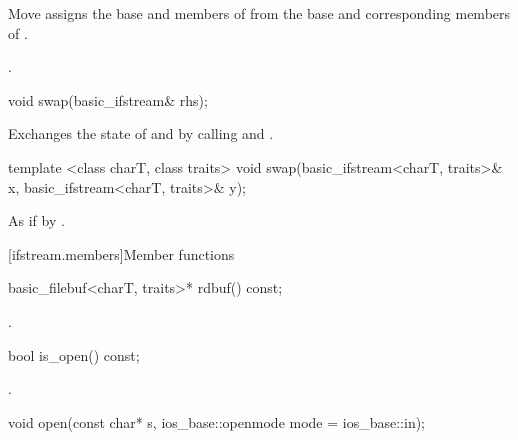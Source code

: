 \begin{itemdescr}
\pnum
\effects Move assigns the base and members of  from the base and corresponding
members of .

\pnum
\returns {}.
\end{itemdescr}

%
\begin{itemdecl}
void swap(basic_ifstream& rhs);
\end{itemdecl}

\begin{itemdescr}
\pnum
\effects Exchanges the state of 
and  by calling
 and
.
\end{itemdescr}

%
\begin{itemdecl}
template <class charT, class traits>
  void swap(basic_ifstream<charT, traits>& x,
            basic_ifstream<charT, traits>& y);
\end{itemdecl}

\begin{itemdescr}
\pnum
\effects As if by .
\end{itemdescr}

[ifstream.members]{Member functions}

%
\begin{itemdecl}
basic_filebuf<charT, traits>* rdbuf() const;
\end{itemdecl}

\begin{itemdescr}
\pnum
\returns
{}.
\end{itemdescr}

%
\begin{itemdecl}
bool is_open() const;
\end{itemdecl}

\begin{itemdescr}
\pnum
\returns
{}.
\end{itemdescr}

%
\begin{itemdecl}
void open(const char* s, ios_base::openmode mode = ios_base::in);
\end{itemdecl}


